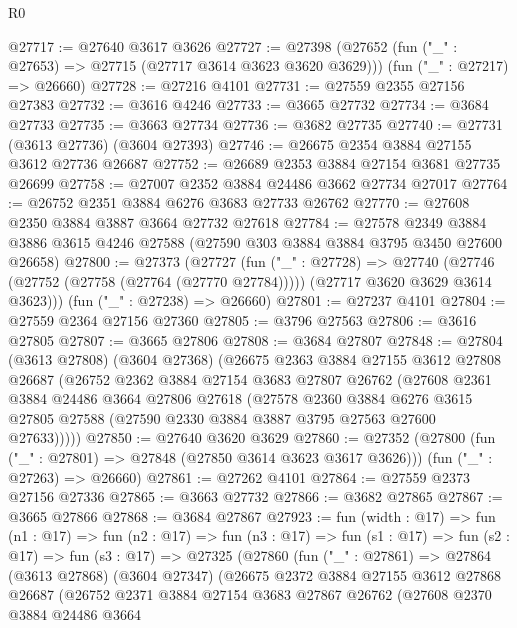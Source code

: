 \begin{lexlean}{R0}
\begin{coremodule}
@27717 := @27640 @3617 @3626
@27727 := @27398
    (@27652 (fun ("_" : @27653) => @27715 (@27717 @3614 @3623 @3620 @3629)))
    (fun ("_" : @27217) => @26660)
@27728 := @27216 @4101
@27731 := @27559 @2355 @27156 @27383
@27732 := @3616 @4246
@27733 := @3665 @27732
@27734 := @3684 @27733
@27735 := @3663 @27734
@27736 := @3682 @27735
@27740 := @27731 (@3613 @27736) (@3604 @27393)
@27746 := @26675 @2354 @3884 @27155 @3612 @27736 @26687
@27752 := @26689 @2353 @3884 @27154 @3681 @27735 @26699
@27758 := @27007 @2352 @3884 @24486 @3662 @27734 @27017
@27764 := @26752 @2351 @3884 @6276 @3683 @27733 @26762
@27770 := @27608 @2350 @3884 @3887 @3664 @27732 @27618
@27784 := @27578
    @2349
    @3884
    @3886
    @3615
    @4246
    @27588
    (@27590 @303 @3884 @3884 @3795 @3450 @27600 @26658)
@27800 := @27373
    (@27727
      (fun ("_" : @27728) =>
      @27740 (@27746 (@27752 (@27758 (@27764 (@27770 @27784))))) (@27717 @3620 @3629 @3614 @3623)))
    (fun ("_" : @27238) => @26660)
@27801 := @27237 @4101
@27804 := @27559 @2364 @27156 @27360
@27805 := @3796 @27563
@27806 := @3616 @27805
@27807 := @3665 @27806
@27808 := @3684 @27807
@27848 := @27804
    (@3613 @27808)
    (@3604 @27368)
    (@26675
      @2363
      @3884
      @27155
      @3612
      @27808
      @26687
      (@26752
        @2362
        @3884
        @27154
        @3683
        @27807
        @26762
        (@27608
          @2361
          @3884
          @24486
          @3664
          @27806
          @27618
          (@27578
            @2360
            @3884
            @6276
            @3615
            @27805
            @27588
            (@27590 @2330 @3884 @3887 @3795 @27563 @27600 @27633)))))
@27850 := @27640 @3620 @3629
@27860 := @27352
    (@27800 (fun ("_" : @27801) => @27848 (@27850 @3614 @3623 @3617 @3626)))
    (fun ("_" : @27263) => @26660)
@27861 := @27262 @4101
@27864 := @27559 @2373 @27156 @27336
@27865 := @3663 @27732
@27866 := @3682 @27865
@27867 := @3665 @27866
@27868 := @3684 @27867
@27923 := fun (width : @17) =>
  fun (n1 : @17) =>
  fun (n2 : @17) =>
  fun (n3 : @17) =>
  fun (s1 : @17) =>
  fun (s2 : @17) =>
  fun (s3 : @17) =>
  @27325
    (@27860
      (fun ("_" : @27861) =>
      @27864
        (@3613 @27868)
        (@3604 @27347)
        (@26675
          @2372
          @3884
          @27155
          @3612
          @27868
          @26687
          (@26752
            @2371
            @3884
            @27154
            @3683
            @27867
            @26762
            (@27608
              @2370
              @3884
              @24486
              @3664

\end{coremodule}
\end{lexlean}
